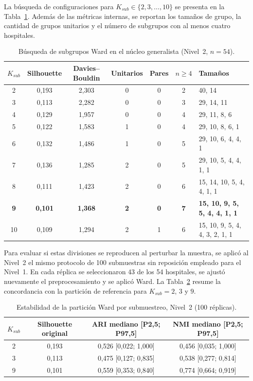 La búsqueda de configuraciones para
$K_{sub}\in\{2,3,\ldots,10\}$ se presenta en la
Tabla~\ref{tab:metricas-nivel2}. Además de las métricas internas, se reportan
los tamaños de grupo, la cantidad de grupos unitarios y el número de
subgrupos con al menos cuatro hospitales.

\begin{table}[htbp]
\centering
\caption{Búsqueda de subgrupos Ward en el núcleo generalista (Nivel~2, $n=54$).}
\label{tab:metricas-nivel2}
\small
\begin{tabular}{c c c c c c l}
\toprule
\textbf{$K_{sub}$} & \textbf{Silhouette} & \textbf{Davies--Bouldin} & \textbf{Unitarios} & \textbf{Pares} & \textbf{$n\geq4$} & \textbf{Tamaños} \\
\midrule
2 & 0,193 & 2,303 & 0 & 0 & 2 & 40, 14 \\
3 & 0,113 & 2,282 & 0 & 0 & 3 & 29, 14, 11 \\
4 & 0,129 & 1,957 & 0 & 0 & 4 & 29, 11, 8, 6 \\
5 & 0,122 & 1,583 & 1 & 0 & 4 & 29, 10, 8, 6, 1 \\
6 & 0,132 & 1,486 & 1 & 0 & 5 & 29, 10, 6, 4, 4, 1 \\
7 & 0,136 & 1,285 & 2 & 0 & 5 & 29, 10, 5, 4, 4, 1, 1 \\
8 & 0,111 & 1,423 & 2 & 0 & 6 & 15, 14, 10, 5, 4, 4, 1, 1 \\
\textbf{9} & \textbf{0,101} & \textbf{1,368} & \textbf{2} & \textbf{0} & \textbf{7} & \textbf{15, 10, 9, 5, 5, 4, 4, 1, 1} \\
10 & 0,109 & 1,294 & 2 & 1 & 6 & 15, 10, 9, 5, 4, 4, 3, 2, 1, 1 \\
\bottomrule
\end{tabular}
\end{table}

Para evaluar si estas divisiones se reproducen al perturbar la muestra, se
aplicó al Nivel~2 el mismo protocolo de 100 submuestras sin reposición empleado
para el Nivel~1. En cada réplica se seleccionaron 43 de los 54 hospitales,
se ajustó nuevamente el preprocesamiento y se aplicó Ward. La Tabla~\ref{tab:estabilidad-nivel2}
resume la concordancia con la partición de referencia para $K_{sub}=2$, $3$ y
$9$.

\begin{table}[htbp]
\centering
\caption{Estabilidad de la partición Ward por submuestreo, Nivel~2 (100 réplicas).}
\label{tab:estabilidad-nivel2}
\begin{tabular}{c c c c}
\toprule
\textbf{$K_{sub}$} & \textbf{Silhouette original} & \textbf{ARI mediano [P2,5; P97,5]} & \textbf{NMI mediano [P2,5; P97,5]} \\
\midrule
2 & 0,193 & 0,526 [0,022; 1,000] & 0,456 [0,035; 1,000] \\
3 & 0,113 & 0,475 [0,127; 0,835] & 0,538 [0,277; 0,814] \\
9 & 0,101 & 0,559 [0,353; 0,840] & 0,774 [0,664; 0,919] \\
\bottomrule
\end{tabular}
\end{table}


